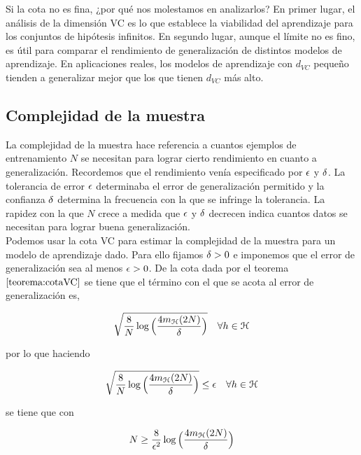     
    Si la cota no es fina, ¿por qué nos molestamos en analizarlos? En primer lugar, el análisis de la dimensión VC es lo que establece la viabilidad del aprendizaje para los conjuntos de hipótesis infinitos. En segundo lugar, aunque el límite no es fino, es útil para comparar el rendimiento de generalización de distintos modelos de aprendizaje. En aplicaciones reales, los modelos de aprendizaje con $d_{VC}$ pequeño tienden a generalizar mejor que los que tienen $d_{VC}$ más alto.  \\




\subsection{Complejidad de la muestra}

    La complejidad de la muestra hace referencia a cuantos ejemplos de entrenamiento $N$ se necesitan para lograr cierto rendimiento en cuanto a generalización. Recordemos que el rendimiento venía especificado por $\epsilon$ y $\delta$. La tolerancia de error $\epsilon$ determinaba el error de generalización permitido y la confianza $\delta$ determina la frecuencia con la que se infringe la tolerancia. La rapidez con la que $N$ crece a medida que $\epsilon$ y $\delta$ decrecen indica cuantos datos se necesitan para lograr buena generalización. \\
    
    Podemos usar la cota VC para estimar la complejidad de la muestra para un modelo de aprendizaje dado. Para ello fijamos $\delta > 0$ e imponemos que el error de generalización sea al menos $\epsilon > 0$. De la cota dada por el teorema $\ref{teorema:cotaVC}$ se tiene que el término con el que se acota al error de generalización es,
    
    \begin{equation}
        \sqrt{\frac{8}{N}\log\Big(\frac{4m_{\mathcal{H}}(2N)}{\delta}\Big)} \quad \forall h \in \mathcal{H}
    \end{equation}

    \noindent por lo que haciendo 
    
    \begin{equation}
        \sqrt{\frac{8}{N}\log\Big(\frac{4m_{\mathcal{H}}(2N)}{\delta}\Big)} \leq \epsilon \quad \forall h \in \mathcal{H} 
    \end{equation}
    
    \noindent se tiene que con
    
    \begin{equation}
        N \geq \frac{8}{\epsilon^2}\log\Big( \frac{4m_{\mathcal{H}}(2N)}{\delta} \Big)
    \end{equation}
    
